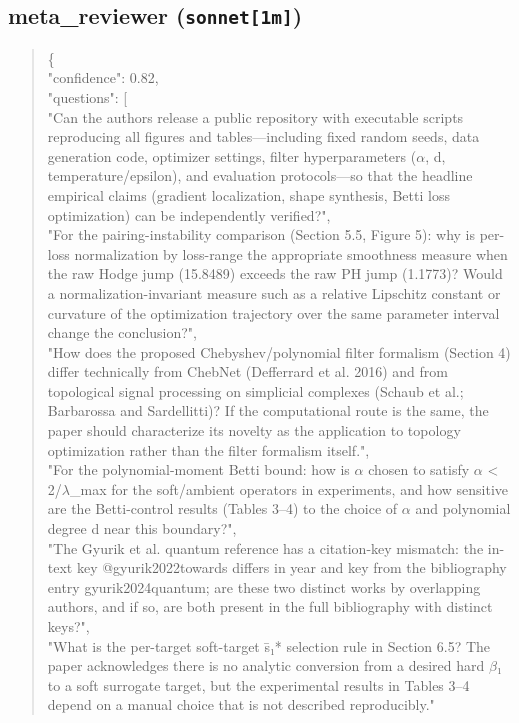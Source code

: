 \documentclass[11pt]{article}
\begin{document}
\subsection*{meta\_reviewer (\texttt{sonnet[1m]})}
\begin{quote}\small\ttfamily\raggedright
\{\\
  "confidence": 0.82,\\
  "questions": [\\
    "Can the authors release a public repository with executable scripts reproducing all figures and tables---including fixed random seeds, data generation code, optimizer settings, filter hyperparameters (\ensuremath{\alpha}, d, temperature/epsilon), and evaluation protocols---so that the headline empirical claims (gradient localization, shape synthesis, Betti loss optimization) can be independently verified?",\\
    "For the pairing-instability comparison (Section 5.5, Figure 5): why is per-loss normalization by loss-range the appropriate smoothness measure when the raw Hodge jump (15.8489) exceeds the raw PH jump (1.1773)? Would a normalization-invariant measure such as a relative Lipschitz constant or curvature of the optimization trajectory over the same parameter interval change the conclusion?",\\
    "How does the proposed Chebyshev/polynomial filter formalism (Section 4) differ technically from ChebNet (Defferrard et al. 2016) and from topological signal processing on simplicial complexes (Schaub et al.; Barbarossa and Sardellitti)? If the computational route is the same, the paper should characterize its novelty as the application to topology optimization rather than the filter formalism itself.",\\
    "For the polynomial-moment Betti bound: how is \ensuremath{\alpha} chosen to satisfy \ensuremath{\alpha} < 2/\ensuremath{\lambda}\_max for the soft/ambient operators in experiments, and how sensitive are the Betti-control results (Tables 3--4) to the choice of \ensuremath{\alpha} and polynomial degree d near this boundary?",\\
    "The Gyurik et al. quantum reference has a citation-key mismatch: the in-text key @gyurik2022towards differs in year and key from the bibliography entry gyurik2024quantum; are these two distinct works by overlapping authors, and if so, are both present in the full bibliography with distinct keys?",\\
    "What is the per-target soft-target s\={}₁* selection rule in Section 6.5? The paper acknowledges there is no analytic conversion from a desired hard \ensuremath{\beta}₁ to a soft surrogate target, but the experimental results in Tables 3--4 depend on a manual choice that is not described reproducibly."\\

\end{quote}
\end{document}
